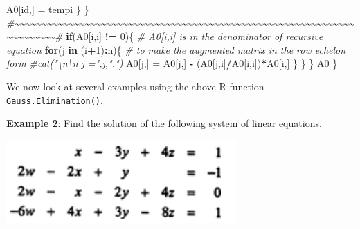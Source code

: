 \documentclass[
]{book}
\newenvironment{Shaded}{\begin{snugshade}}{\end{snugshade}}
\newcommand{\CommentTok}[1]{\textcolor[rgb]{0.56,0.35,0.01}{\textit{#1}}}
\newcommand{\ControlFlowTok}[1]{\textcolor[rgb]{0.13,0.29,0.53}{\textbf{#1}}}
\newcommand{\DecValTok}[1]{\textcolor[rgb]{0.00,0.00,0.81}{#1}}
\newcommand{\NormalTok}[1]{#1}
\newcommand{\OtherTok}[1]{\textcolor[rgb]{0.56,0.35,0.01}{#1}}
\newcommand{\SpecialCharTok}[1]{\textcolor[rgb]{0.81,0.36,0.00}{\textbf{#1}}}
\begin{document}
\begin{Shaded}
\begin{Highlighting}[]
\NormalTok{              A0[id,] }\OtherTok{=}\NormalTok{ tempi    }
\NormalTok{            \}}
\NormalTok{      \}}
      \CommentTok{\#\textasciitilde{}\textasciitilde{}\textasciitilde{}\textasciitilde{}\textasciitilde{}\textasciitilde{}\textasciitilde{}\textasciitilde{}\textasciitilde{}\textasciitilde{}\textasciitilde{}\textasciitilde{}\textasciitilde{}\textasciitilde{}\textasciitilde{}\textasciitilde{}\textasciitilde{}\textasciitilde{}\textasciitilde{}\textasciitilde{}\textasciitilde{}\textasciitilde{}\textasciitilde{}\textasciitilde{}\textasciitilde{}\textasciitilde{}\textasciitilde{}\textasciitilde{}\textasciitilde{}\textasciitilde{}\textasciitilde{}\textasciitilde{}\textasciitilde{}\textasciitilde{}\textasciitilde{}\textasciitilde{}\textasciitilde{}\textasciitilde{}\textasciitilde{}\textasciitilde{}\textasciitilde{}\textasciitilde{}\textasciitilde{}\textasciitilde{}\textasciitilde{}\textasciitilde{}\textasciitilde{}\textasciitilde{}\textasciitilde{}\textasciitilde{}\textasciitilde{}\textasciitilde{}\textasciitilde{}\textasciitilde{}\textasciitilde{}\textasciitilde{}\textasciitilde{}\textasciitilde{}\textasciitilde{}\textasciitilde{}\textasciitilde{}\textasciitilde{}\textasciitilde{}\textasciitilde{}\textasciitilde{}\textasciitilde{}\textasciitilde{}\textasciitilde{}\textasciitilde{}\textasciitilde{}\textasciitilde{}\textasciitilde{}\#}
       \ControlFlowTok{if}\NormalTok{(A0[i,i] }\SpecialCharTok{!=} \DecValTok{0}\NormalTok{)\{    }\CommentTok{\# A0[i,i] is in the denominator of recursive equation}
          \ControlFlowTok{for}\NormalTok{(j }\ControlFlowTok{in}\NormalTok{ (i}\SpecialCharTok{+}\DecValTok{1}\NormalTok{)}\SpecialCharTok{:}\NormalTok{n)\{  }\CommentTok{\# to make the augmented matrix in the row echelon form}
             \CommentTok{\#cat("\textbackslash{}n\textbackslash{}n j =",j,".")}
\NormalTok{             A0[j,] }\OtherTok{=}\NormalTok{ A0[j,] }\SpecialCharTok{{-}}\NormalTok{ (A0[j,i]}\SpecialCharTok{/}\NormalTok{A0[i,i])}\SpecialCharTok{*}\NormalTok{A0[i,]}
\NormalTok{           \}}
\NormalTok{        \}}
\NormalTok{      \}}
\NormalTok{   A0}
\NormalTok{ \}}
\end{Highlighting}
\end{Shaded}

We now look at several examples using the above R function \texttt{Gauss.Elimination()}.

\textbf{Example 2}: Find the solution of the following system of linear equations.

\begin{center}\includegraphics[width=0.35\linewidth]{img07/w07-LabExample02-eq} \end{center}
\end{document}
